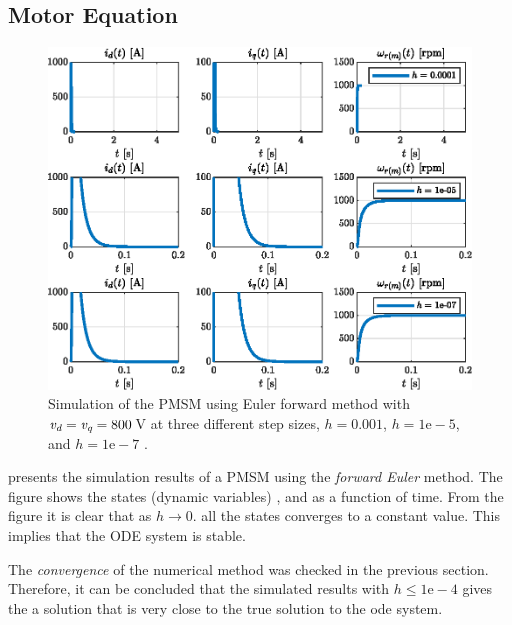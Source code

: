\subsection{Motor Equation}
\begin{figure}[t!b!]
	\centering
	\includegraphics[width=\textwidth]{Figures/ef_MotorCase.eps}
	\caption{Simulation of the PMSM using Euler forward method with $\textit{v\textsubscript{d}}=\textit{v\textsubscript{q}}=800\,$V at three different step sizes, $h = 0.001$, $h = 1\text{e}-5$, and $h = 1\text{e}-7$ .}
	\label{fig:EMresEF}
\end{figure}
 presents the simulation results of a PMSM using the \textit{forward Euler} method. The figure shows the states (dynamic variables) \id, \iq and \wm as a function of time. From the figure it is clear that as $h\rightarrow0$. all the states converges to a constant value. This implies that %
the ODE system is stable. 

The \textit{convergence} of the numerical method was checked in the previous section. Therefore, it can be concluded that the simulated results with $h \leq 1\text{e}-4$ gives the a solution that is very close to the true solution to the ode system.


